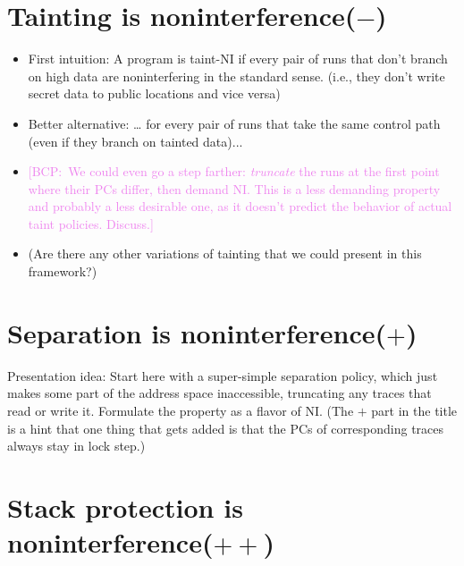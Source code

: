 \documentclass[conference]{IEEEtran}
\newif\ifdraft \drafttrue
\newcommand{\bcp}[1]{\ifdraft\textcolor{violet}{{[BCP:~#1]}}\fi}
\begin{document}
\section{Tainting is noninterference($-$)}

\begin{itemize}
\item First intuition: A program is taint-NI if every pair of runs that don’t
branch on high data are noninterfering in the standard sense.  (i.e., they
don't write secret data to public locations and vice versa)
\item Better alternative: … for every pair of runs that take the same control path (even if they branch on tainted data)...
\item \bcp{We could even go a step farther: {\em truncate} the runs at the
  first point where their PCs differ, then demand NI.  This is a less
  demanding property and probably a less desirable one, as it doesn't
  predict the behavior of actual taint policies.  Discuss.}
\item (Are there any other variations of tainting that we could present in
this framework?)
\end{itemize}

\section{Separation is noninterference($+$)}

Presentation idea: Start here with a super-simple separation policy, which
just makes some part of the address space inaccessible, truncating any
traces that read or write it.  Formulate the property as a flavor of NI.
(The $+$ part in the title is a hint that one thing that gets added is that
the PCs of corresponding traces always stay in lock step.)

\section{Stack protection is noninterference($++$)}
\end{document}
